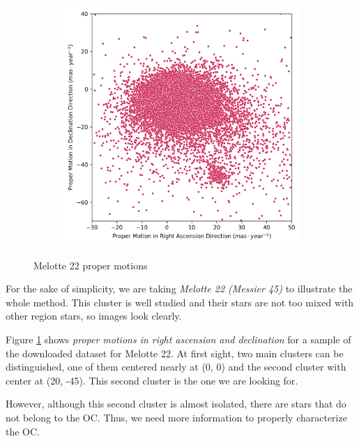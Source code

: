\documentclass[11pt, a4paper, english]{book}
\begin{document}
\begin{figure}[htbp]
  \centering
  \begin{subfigure}{0.5\textwidth}
    \centering
    \includegraphics[width=\textwidth]{../figures/melotte_22/raw_pm_melotte_22.png}
  \end{subfigure}
  \caption{Melotte 22 proper motions}
  \label{fig:raw_pm_melotte_22}
\end{figure}

For the sake of simplicity, we are taking \emph{Melotte 22 (Messier 45)} \cite{elsanhoury2019ppmxl} to illustrate the whole method. This cluster is well studied
and their stars are not too mixed with other region stars, so images look clearly.

Figure \ref{fig:raw_pm_melotte_22} shows \emph{proper motions in right ascension and declination} for a sample of the downloaded dataset for Melotte 22.
At first sight, two main clusters can be distinguished, one of them centered nearly at (0, 0) and the second cluster with center at (20, -45). This second cluster
is the one we are looking for.

However, although this second cluster is almost isolated, there are stars that do not belong to the OC. Thus, we need more information to properly characterize the OC.
\end{document}
